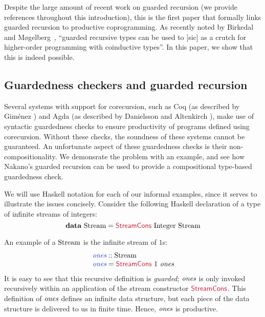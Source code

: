 Despite the large amount of recent work on guarded recursion (we
provide references throughout this introduction), this is the first
paper that formally links guarded recursion to productive
coprogramming. As recently noted by Birkedal and
M{\o}gelberg~\cite{birkedal13intensional}, ``guarded recursive types
can be used to [sic] as a crutch for higher-order programming with
coinductive types''. In this paper, we show that this is indeed
possible.

\subsection{Guardedness checkers and guarded recursion}

Several systems with support for corecursion, such as Coq (as
described by Gim{\'e}nez \cite{gimenez94codifying}) and Agda (as
described by Danielsson and Altenkirch \cite{danielsson09mixing}),
make use of syntactic guardedness checks to ensure productivity of
programs defined using corecursion. Without these checks, the
soundness of these systems cannot be guaranteed. An unfortunate aspect
of these guardedness checks is their non-compositionality. We
demonsrate the problem with an example, and see how Nakano's guarded
recursion can be used to provide a compositional type-based
guardedness check.

We will use Haskell notation for each of our informal examples, since
it serves to illustrate the issues concisely. Consider the following
Haskell declaration of a type of infinite streams of integers:
\begin{displaymath}
  \kw{data}\ \tyname{Stream} = \cons{StreamCons}\ \tyname{Integer}\ \tyname{Stream}
\end{displaymath}

An example of a $\textrm{Stream}$ is the infinite stream of $1$s:
\begin{displaymath}
  \begin{array}{l}
    \defn{ones} :: \tyname{Stream} \\
    \defn{ones} = \cons{StreamCons}\ 1\ \ident{ones}
  \end{array}
\end{displaymath}
It is easy to see that this recursive definition is \emph{guarded};
$\textit{ones}$ is only invoked recursively within an application of
the stream constructor $\cons{StreamCons}$. This definition of
$\textit{ones}$ defines an infinite data structure, but each piece of
the data structure is delivered to us in finite time. Hence,
$\textit{ones}$ is productive.

